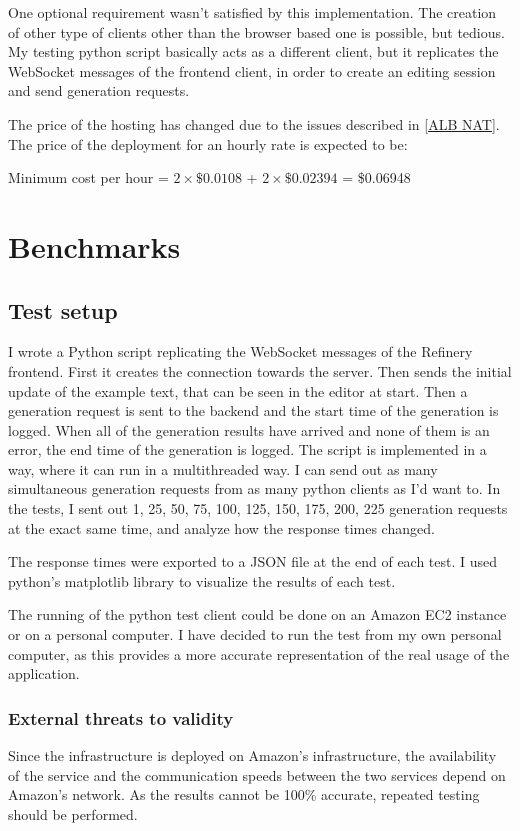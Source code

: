 	One optional requirement wasn't satisfied by this implementation. The creation of other type of clients other than the browser
	based one is possible, but tedious. My testing python script basically acts as a different client, but it replicates the WebSocket
	messages of the frontend client, in order to create an editing session and send generation requests.

	The price of the hosting has changed due to the issues described in \ref{ALB NAT}. The price of the deployment for an hourly rate 
	is expected to be:

	\begin{center}
		Minimum cost per hour = $2 \times \$0.0108$ + $2 \times \$0.02394$ = \$0.06948
	\end{center}

	\section{Benchmarks} \label{Benchmarks}
		\subsection{Test setup}
		I wrote a Python script replicating the WebSocket messages of the Refinery frontend. First it creates the connection
		towards the server. Then sends the initial update
		of the example text, that can be seen in the editor at start. Then a generation request is sent to the backend and the start time of the generation
		is logged. When all of the generation results have arrived and none of them is an error, the end time of the generation is logged. 
		The script is implemented in a way, where it can run in a multithreaded way. I can send out as many simultaneous generation requests 
		from as many python clients as I'd want to. In the tests, I sent out 1, 25, 50, 75, 100, 125, 150, 175, 200, 225 generation requests
		at the exact same time, and analyze how the response times changed.

		The response times were exported to a JSON file at the end of each test. I used python's matplotlib library to visualize the results
		of each test.

		The running of the python test client could be done on an Amazon EC2 instance or on a personal computer. I have decided to run the test 
		from my own personal computer, as this provides a more accurate representation of the real usage of the application.

		\subsubsection{External threats to validity}
			Since the infrastructure is deployed on Amazon's infrastructure, the availability of the service and the communication speeds between the two services 
			depend on Amazon's network. As the results cannot be 100\% accurate, repeated testing should be
			performed.

